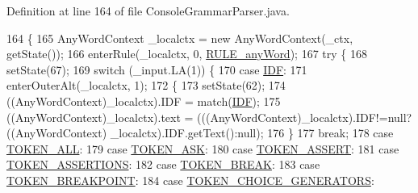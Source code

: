 Definition at line 164 of file Console\+Grammar\+Parser.\+java.


\begin{DoxyCode}
164                                                                     \{
165     AnyWordContext \_localctx = \textcolor{keyword}{new} AnyWordContext(\_ctx, getState());
166     enterRule(\_localctx, 0, \hyperlink{classgov_1_1nasa_1_1jpf_1_1inspector_1_1client_1_1parser_1_1_console_grammar_parser_a83d839fc36ae733f825354ca2d8dc061}{RULE\_anyWord});
167     \textcolor{keywordflow}{try} \{
168       setState(67);
169       \textcolor{keywordflow}{switch} (\_input.LA(1)) \{
170       \textcolor{keywordflow}{case} \hyperlink{classgov_1_1nasa_1_1jpf_1_1inspector_1_1client_1_1parser_1_1_console_grammar_parser_ae9d41d0f0abda3e06c7f452164d2e3a0}{IDF}:
171         enterOuterAlt(\_localctx, 1);
172         \{
173         setState(62);
174         ((AnyWordContext)\_localctx).IDF = match(\hyperlink{classgov_1_1nasa_1_1jpf_1_1inspector_1_1client_1_1parser_1_1_console_grammar_parser_ae9d41d0f0abda3e06c7f452164d2e3a0}{IDF});
175          ((AnyWordContext)\_localctx).text =  (((AnyWordContext)\_localctx).IDF!=null?((AnyWordContext)
      \_localctx).IDF.getText():null); 
176         \}
177         \textcolor{keywordflow}{break};
178       \textcolor{keywordflow}{case} \hyperlink{classgov_1_1nasa_1_1jpf_1_1inspector_1_1client_1_1parser_1_1_console_grammar_parser_ab726fcc8549a7dccea5cb8701b348235}{TOKEN\_ALL}:
179       \textcolor{keywordflow}{case} \hyperlink{classgov_1_1nasa_1_1jpf_1_1inspector_1_1client_1_1parser_1_1_console_grammar_parser_aceaa83591a76f17801362890ec5ace12}{TOKEN\_ASK}:
180       \textcolor{keywordflow}{case} \hyperlink{classgov_1_1nasa_1_1jpf_1_1inspector_1_1client_1_1parser_1_1_console_grammar_parser_a53439b8a59a0be879a077ffb8bb59107}{TOKEN\_ASSERT}:
181       \textcolor{keywordflow}{case} \hyperlink{classgov_1_1nasa_1_1jpf_1_1inspector_1_1client_1_1parser_1_1_console_grammar_parser_a4a9f5da8ded8ec86d64dafbf8e21bb64}{TOKEN\_ASSERTIONS}:
182       \textcolor{keywordflow}{case} \hyperlink{classgov_1_1nasa_1_1jpf_1_1inspector_1_1client_1_1parser_1_1_console_grammar_parser_a947dbd1a6bd8826973b25226b63ebb71}{TOKEN\_BREAK}:
183       \textcolor{keywordflow}{case} \hyperlink{classgov_1_1nasa_1_1jpf_1_1inspector_1_1client_1_1parser_1_1_console_grammar_parser_a951264100f5521a2f0081d21d838a3ab}{TOKEN\_BREAKPOINT}:
184       \textcolor{keywordflow}{case} \hyperlink{classgov_1_1nasa_1_1jpf_1_1inspector_1_1client_1_1parser_1_1_console_grammar_parser_abc82b513c43997c7369162a20cb4887b}{TOKEN\_CHOICE\_GENERATORS}:

\end{DoxyCode}
